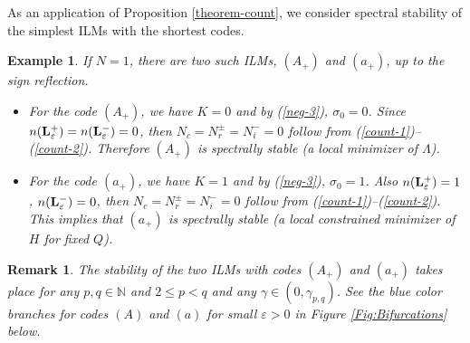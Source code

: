 \documentclass[12pt,reqno]{amsart}
\newtheorem{remark}{Remark}
\newtheorem{example}{Example}
\begin{document}
As an application of Proposition \ref{theorem-count}, we consider spectral stability of the simplest ILMs with the shortest codes.

\begin{example}
	\label{ex-stable-1}
If $N = 1$, there are two such ILMs, $(A_+)$ and $(a_+)$, up to the sign reflection. 
	\begin{itemize}
		\item  For the code $(A_+)$, we have $K = 0$ and by (\ref{neg-3}), $\sigma_0 = 0$. Since $n({\bf L}^+_\varepsilon) = n({\bf L}^-_\varepsilon) = 0$, then $N_c = N_r^\pm = N_i^- = 0$ follow from (\ref{count-1})--(\ref{count-2}). Therefore  $(A_+)$ is spectrally stable (a local minimizer of $\Lambda$).
		\item  For the code $(a_+)$, we have $K =1$ and by (\ref{neg-3}), $\sigma_0 = 1$. Also $n({\bf L}^+_\varepsilon)=1$,  $n({\bf L}^-_\varepsilon) = 0$, then $N_c=N_r^\pm =N_i^-=0$ follow from (\ref{count-1})--(\ref{count-2}). This implies that  $(a_+)$ is spectrally stable (a local constrained minimizer of $H$ for fixed $Q$).
	\end{itemize}
\end{example}

\begin{remark}
	The stability of the two ILMs with codes $(A_+)$ and $(a_+)$ takes place for any $p,q\in \mathbb{N}$ and $2 \leq p < q$ and any $\gamma \in (0,\gamma_{{p,q}})$. See the blue color branches for codes $(A)$ and $(a)$ for small $\varepsilon > 0$ in Figure \ref{Fig:Bifurcations} below.
\end{remark}
\end{document}
